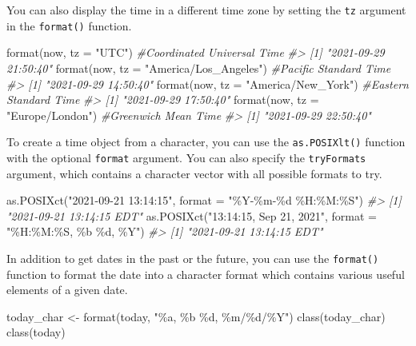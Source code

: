 \documentclass[
]{book}
\newenvironment{Shaded}{\begin{snugshade}}{\end{snugshade}}
\newcommand{\AttributeTok}[1]{\textcolor[rgb]{0.77,0.63,0.00}{#1}}
\newcommand{\CommentTok}[1]{\textcolor[rgb]{0.56,0.35,0.01}{\textit{#1}}}
\newcommand{\FunctionTok}[1]{\textcolor[rgb]{0.00,0.00,0.00}{#1}}
\newcommand{\NormalTok}[1]{#1}
\newcommand{\OtherTok}[1]{\textcolor[rgb]{0.56,0.35,0.01}{#1}}
\newcommand{\StringTok}[1]{\textcolor[rgb]{0.31,0.60,0.02}{#1}}
\begin{document}
You can also display the time in a different time zone by setting the \texttt{tz} argument in the \texttt{format()} function.

\begin{Shaded}
\begin{Highlighting}[]
\FunctionTok{format}\NormalTok{(now, }\AttributeTok{tz =} \StringTok{"UTC"}\NormalTok{)                 }\CommentTok{\#Coordinated Universal Time}
\CommentTok{\#\textgreater{} [1] "2021{-}09{-}29 21:50:40"}
\FunctionTok{format}\NormalTok{(now, }\AttributeTok{tz =} \StringTok{"America/Los\_Angeles"}\NormalTok{) }\CommentTok{\#Pacific Standard Time}
\CommentTok{\#\textgreater{} [1] "2021{-}09{-}29 14:50:40"}
\FunctionTok{format}\NormalTok{(now, }\AttributeTok{tz =} \StringTok{"America/New\_York"}\NormalTok{)    }\CommentTok{\#Eastern Standard Time}
\CommentTok{\#\textgreater{} [1] "2021{-}09{-}29 17:50:40"}
\FunctionTok{format}\NormalTok{(now, }\AttributeTok{tz =} \StringTok{"Europe/London"}\NormalTok{)       }\CommentTok{\#Greenwich Mean Time }
\CommentTok{\#\textgreater{} [1] "2021{-}09{-}29 22:50:40"}
\end{Highlighting}
\end{Shaded}

To create a time object from a character, you can use the \texttt{as.POSIXlt()} function with the optional \texttt{format} argument. You can also specify the \texttt{tryFormats} argument, which contains a character vector with all possible formats to try.

\begin{Shaded}
\begin{Highlighting}[]
\FunctionTok{as.POSIXct}\NormalTok{(}\StringTok{"2021{-}09{-}21 13:14:15"}\NormalTok{, }\AttributeTok{format =} \StringTok{"\%Y{-}\%m{-}\%d \%H:\%M:\%S"}\NormalTok{)}
\CommentTok{\#\textgreater{} [1] "2021{-}09{-}21 13:14:15 EDT"}
\FunctionTok{as.POSIXct}\NormalTok{(}\StringTok{"13:14:15, Sep 21, 2021"}\NormalTok{, }\AttributeTok{format =} \StringTok{"\%H:\%M:\%S, \%b \%d, \%Y"}\NormalTok{)}
\CommentTok{\#\textgreater{} [1] "2021{-}09{-}21 13:14:15 EDT"}
\end{Highlighting}
\end{Shaded}

In addition to get dates in the past or the future, you can use the \texttt{format()} function to format the date into a character format which contains various useful elements of a given date.

\begin{Shaded}
\begin{Highlighting}[]
\NormalTok{today\_char }\OtherTok{\textless{}{-}} \FunctionTok{format}\NormalTok{(today, }\StringTok{"\%a, \%b \%d, \%m/\%d/\%Y"}\NormalTok{)}
\FunctionTok{class}\NormalTok{(today\_char)}
\FunctionTok{class}\NormalTok{(today)}
\end{Highlighting}
\end{Shaded}
\end{document}
